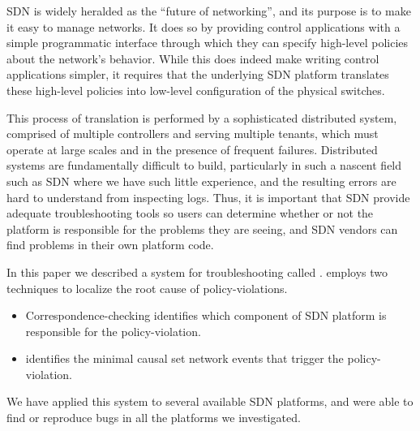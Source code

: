 SDN is widely heralded as the ``future of networking'', and its purpose is to make it easy to manage networks.  It does so by providing control applications with a simple programmatic interface through which they can specify high-level policies about the network's behavior. While this does indeed make writing control applications simpler, it requires that the underlying SDN platform translates these high-level policies into low-level configuration of the physical switches.

This process of translation is performed by a sophisticated distributed system, comprised of multiple controllers and serving multiple tenants, which must operate at large scales and in the presence of frequent failures. Distributed systems are fundamentally difficult to build, particularly in such a nascent field such as SDN where we have such little experience, and the resulting errors are hard to understand from inspecting logs. Thus, it is important that SDN provide adequate troubleshooting tools so users can determine whether or not the platform is responsible for the problems they are seeing, and SDN vendors can find problems in their own platform code.

In this paper we described a system for troubleshooting called \projectname{}. \projectname{} employs two techniques to localize the root cause of policy-violations.\begin{itemize}
    \item Correspondence-checking identifies which component of SDN platform is responsible for the policy-violation.
    \item  \Simulator{} identifies the minimal causal set network events that trigger the policy-violation.
\end{itemize}

We have applied this system to several available SDN platforms, and were able to find or reproduce bugs in all the platforms we investigated.
